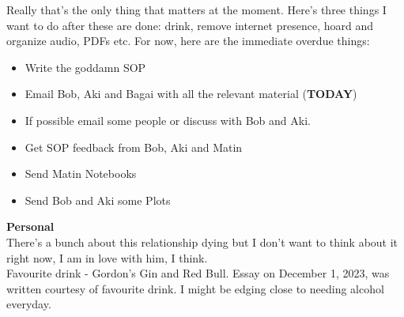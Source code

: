 \noindent {}

Really that's the only thing that matters at the moment. Here's three things I want to do after these are done: drink, remove internet presence, hoard and organize audio, PDFs etc. For now, here are the immediate overdue things:
\begin{itemize}
    \item Write the goddamn SOP
    \item Email Bob, Aki and Bagai with all the relevant material (\textbf{TODAY})
    \item If possible email some people or discuss with Bob and Aki. 
    \item Get SOP feedback from Bob, Aki and Matin
    \item Send Matin Notebooks
    \item Send Bob and Aki some Plots
\end{itemize}

\noindent \textbf{Personal}\\
There's a bunch about this relationship dying but I don't want to think about it right now, I am in love with him, I think.\\
Favourite drink - Gordon's Gin and Red Bull. Essay on December 1, 2023, was written courtesy of favourite drink. I might be edging close to needing alcohol everyday.\\